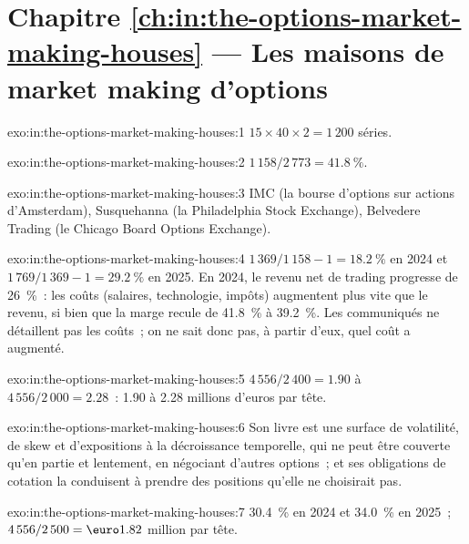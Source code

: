 \section*{Chapitre \ref{ch:in:the-options-market-making-houses} --- Les maisons de market making d'options}

\begin{solution}{exo:in:the-options-market-making-houses:1}
$15\times40\times2=1\,200$ séries.
\end{solution}

\begin{solution}{exo:in:the-options-market-making-houses:2}
$1\,158/2\,773=41.8~\%$.
\end{solution}

\begin{solution}{exo:in:the-options-market-making-houses:3}
IMC (la bourse d'options sur actions d'Amsterdam), Susquehanna (la Philadelphia Stock Exchange), Belvedere Trading (le
Chicago Board Options Exchange).
\end{solution}

\begin{solution}{exo:in:the-options-market-making-houses:4}
$1\,369/1\,158-1=18.2~\%$ en 2024 et $1\,769/1\,369-1=29.2~\%$ en 2025. En 2024, le revenu net de trading progresse de 26~\%~: les coûts
(salaires, technologie, impôts) augmentent plus vite que le revenu, si bien que la marge recule de 41.8~\% à 39.2~\%. Les communiqués ne détaillent pas
les coûts~; on ne sait donc pas, à partir d'eux, quel coût a augmenté.
\end{solution}

\begin{solution}{exo:in:the-options-market-making-houses:5}
$4\,556/2\,400=1.90$ à $4\,556/2\,000=2.28$~: 1.90 à 2.28 millions d'euros par tête.
\end{solution}

\begin{solution}{exo:in:the-options-market-making-houses:6}
Son livre est une surface de volatilité, de skew et d'expositions à la décroissance temporelle, qui ne peut être couverte
qu'en partie et lentement, en négociant d'autres options~; et ses obligations de cotation la conduisent à prendre des positions qu'elle ne choisirait pas.
\end{solution}

\begin{solution}{exo:in:the-options-market-making-houses:7}
30.4~\% en 2024 et 34.0~\% en 2025~; $4\,556/2\,500=\text{\euro}1.82$ million par tête.
\end{solution}

